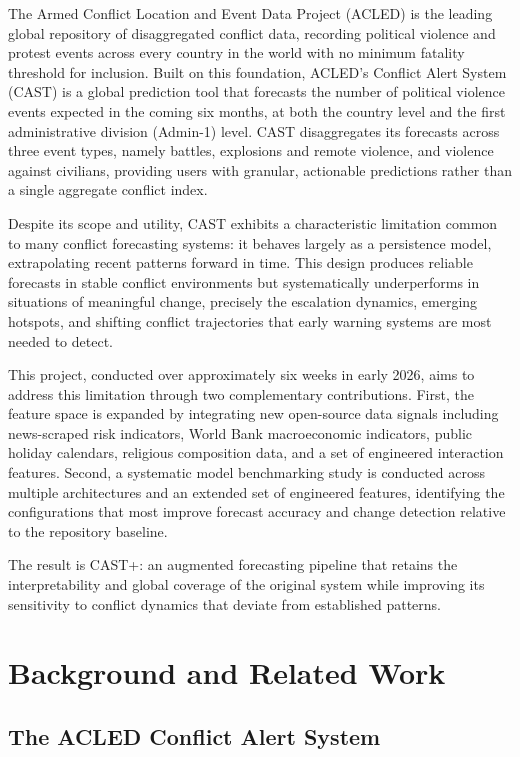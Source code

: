 \documentclass[12pt,a4paper]{article}
\begin{document}
The Armed Conflict Location and Event Data Project (ACLED) is the
leading global repository of disaggregated conflict data, recording
political violence and protest events across every country in the world
with no minimum fatality threshold for inclusion. Built on this
foundation, ACLED's Conflict Alert System (CAST) is a global prediction
tool that forecasts the number of political violence events expected in
the coming six months, at both the country level and the first
administrative division (Admin-1) level. CAST disaggregates its forecasts
across three event types, namely battles, explosions and remote violence,
and violence against civilians, providing users with granular, actionable
predictions rather than a single aggregate conflict index.

Despite its scope and utility, CAST exhibits a characteristic limitation
common to many conflict forecasting systems: it behaves largely as a
persistence model, extrapolating recent patterns forward in time. This
design produces reliable forecasts in stable conflict environments but
systematically underperforms in situations of meaningful change, precisely
the escalation dynamics, emerging hotspots, and shifting conflict
trajectories that early warning systems are most needed to detect.

This project, conducted over approximately six weeks in early 2026, aims
to address this limitation through two complementary contributions. First,
the feature space is expanded by integrating new open-source data signals
including news-scraped risk indicators, World Bank macroeconomic
indicators, public holiday calendars, religious composition data, and a
set of engineered interaction features. Second, a systematic model
benchmarking study is conducted across multiple architectures and an
extended set of engineered features, identifying the configurations that
most improve forecast accuracy and change detection relative to the
repository baseline.

The result is CAST+: an augmented forecasting pipeline that retains the
interpretability and global coverage of the original system while
improving its sensitivity to conflict dynamics that deviate from
established patterns.


\section{Background and Related Work}

\subsection{The ACLED Conflict Alert System}
\end{document}
